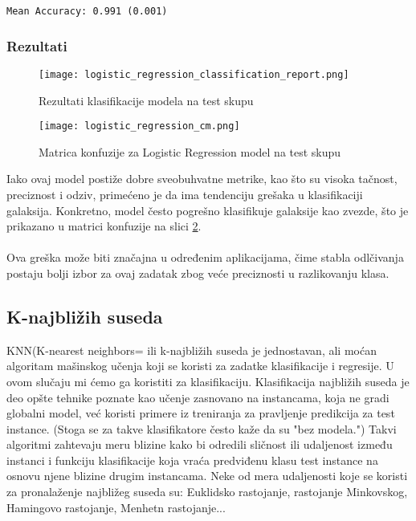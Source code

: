 \documentclass[a4paper,12pt]{article}
\begin{document}
\begin{verbatim}
Mean Accuracy: 0.991 (0.001)
\end{verbatim}

\clearpage

\subsubsection{Rezultati}

\begin{figure}[h!]
\centering
\texttt{[image: logistic\_regression\_classification\_report.png]}
\caption{Rezultati klasifikacije modela na test skupu}
\label{fig:logistic_regression_classification_report}
\end{figure}

\begin{figure}[h!]
\centering
\texttt{[image: logistic\_regression\_cm.png]}
\caption{Matrica konfuzije za Logistic Regression model na test skupu}
\label{fig:logistic_regression_cm}
\end{figure}

Iako ovaj model postiže dobre sveobuhvatne metrike, kao što su visoka tačnost, preciznost i odziv, primećeno je da ima tendenciju grešaka u klasifikaciji galaksija. Konkretno, model često pogrešno klasifikuje galaksije kao zvezde, što je prikazano u matrici konfuzije na slici \ref{fig:logistic_regression_cm}.\\\\
Ova greška može biti značajna u određenim aplikacijama, čime stabla odlčivanja postaju bolji izbor za ovaj zadatak zbog veće preciznosti u razlikovanju klasa.

\subsection{K-najbližih suseda}

KNN(K-nearest neighbors= ili k-najbližih suseda je jednostavan, ali moćan algoritam mašinskog učenja koji se koristi za zadatke klasifikacije i regresije. U ovom slučaju mi ćemo ga koristiti za klasifikaciju. Klasifikacija najbližih suseda je deo opšte tehnike poznate kao učenje zasnovano na instancama, koja ne gradi globalni model, već koristi primere iz treniranja za pravljenje predikcija za test instance. (Stoga se za takve klasifikatore često kaže da su "bez modela.") Takvi algoritmi zahtevaju meru blizine kako bi odredili sličnost ili udaljenost između instanci i funkciju klasifikacije koja vraća predviđenu klasu test instance na osnovu njene blizine drugim instancama. Neke od mera udaljenosti koje se koristi za pronalaženje najbližeg suseda su: Euklidsko rastojanje, rastojanje Minkovskog, Hamingovo rastojanje, Menhetn rastojanje...
\end{document}
